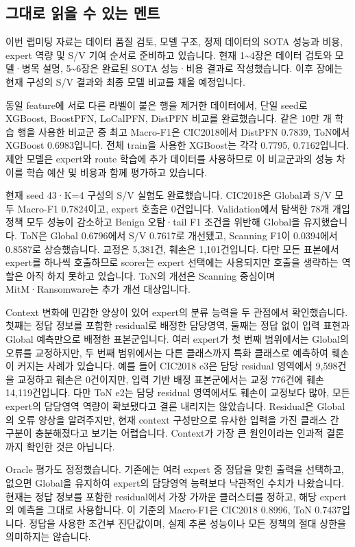 \subsection{그대로 읽을 수 있는 멘트}
이번 랩미팅 자료는 데이터 품질 검토, 모델 구조, 정제 데이터의 SOTA 성능과 비용, expert 역량 및 S/\allowbreak{}V 기여 순서로 준비하고 있습니다. 현재 1\textasciitilde{}4장은 데이터 검토와 모델·병목 설명, 5\textasciitilde{}6장은 완료된 SOTA 성능·비용 결과로 작성했습니다. 이후 장에는 현재 구성의 S/\allowbreak{}V 결과와 최종 모델 비교를 채울 예정입니다.

동일 feature에 서로 다른 라벨이 붙은 행을 제거한 데이터에서, 단일 seed로 XGBoost, BoostPFN, LoCalPFN, DistPFN 비교를 완료했습니다. 같은 10만 개 학습 행을 사용한 비교군 중 최고 Macro-F1은 CIC2018에서 DistPFN 0.7839, ToN에서 XGBoost 0.6983입니다. 전체 train을 사용한 XGBoost는 각각 0.7795, 0.7162입니다. 제안 모델은 expert와 route 학습에 추가 데이터를 사용하므로 이 비교군과의 성능 차이를 학습 예산 및 비용과 함께 평가하고 있습니다.

현재 seed 43·K=\allowbreak{}4 구성의 S/\allowbreak{}V 실험도 완료했습니다. CIC2018은 Global과 S/\allowbreak{}V 모두 Macro-F1 0.7824이고, expert 호출은 0건입니다. Validation에서 탐색한 78개 개입 정책 모두 성능이 감소하고 Benign 오탐·tail F1 조건을 위반해 Global을 유지했습니다. ToN은 Global 0.6796에서 S/\allowbreak{}V 0.7617로 개선됐고, Scanning F1이 0.0394에서 0.8587로 상승했습니다. 교정은 5,381건, 훼손은 1,101건입니다. 다만 모든 표본에서 expert를 하나씩 호출하므로 scorer는 expert 선택에는 사용되지만 호출을 생략하는 역할은 아직 하지 못하고 있습니다. ToN의 개선은 Scanning 중심이며 MitM·Ransomware는 추가 개선 대상입니다.

Context 변화에 민감한 양상이 있어 expert의 분류 능력을 두 관점에서 확인했습니다. 첫째는 정답 정보를 포함한 residual로 배정한 담당영역, 둘째는 정답 없이 입력 표현과 Global 예측만으로 배정한 표본군입니다. 여러 expert가 첫 번째 범위에서는 Global의 오류를 교정하지만, 두 번째 범위에서는 다른 클래스까지 특화 클래스로 예측하여 훼손이 커지는 사례가 있습니다. 예를 들어 CIC2018 e3은 담당 residual 영역에서 9,598건을 교정하고 훼손은 0건이지만, 입력 기반 배정 표본군에서는 교정 776건에 훼손 14,119건입니다. 다만 ToN e2는 담당 residual 영역에서도 훼손이 교정보다 많아, 모든 expert의 담당영역 역량이 확보됐다고 결론 내리지는 않았습니다. Residual은 Global의 오류 양상을 알려주지만, 현재 context 구성만으로 유사한 입력을 가진 클래스 간 구분이 충분해졌다고 보기는 어렵습니다. Context가 가장 큰 원인이라는 인과적 결론까지 확인한 것은 아닙니다.

Oracle 평가도 정정했습니다. 기존에는 여러 expert 중 정답을 맞힌 출력을 선택하고, 없으면 Global을 유지하여 expert의 담당영역 능력보다 낙관적인 수치가 나왔습니다. 현재는 정답 정보를 포함한 residual에서 가장 가까운 클러스터를 정하고, 해당 expert의 예측을 그대로 사용합니다. 이 기준의 Macro-F1은 CIC2018 0.8996, ToN 0.7437입니다. 정답을 사용한 조건부 진단값이며, 실제 추론 성능이나 모든 정책의 절대 상한을 의미하지는 않습니다.

